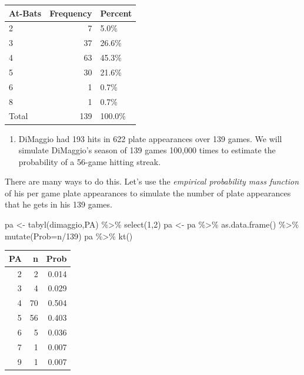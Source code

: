 \documentclass[
  11pt,
]{book}
\newenvironment{Shaded}{\begin{snugshade}}{\end{snugshade}}
\newcommand{\AttributeTok}[1]{\textcolor[rgb]{0.77,0.63,0.00}{#1}}
\newcommand{\DecValTok}[1]{\textcolor[rgb]{0.00,0.00,0.81}{#1}}
\newcommand{\FunctionTok}[1]{\textcolor[rgb]{0.00,0.00,0.00}{#1}}
\newcommand{\NormalTok}[1]{#1}
\newcommand{\OtherTok}[1]{\textcolor[rgb]{0.56,0.35,0.01}{#1}}
\newcommand{\SpecialCharTok}[1]{\textcolor[rgb]{0.00,0.00,0.00}{#1}}
\providecommand{\tightlist}{%
  \setlength{\itemsep}{0pt}\setlength{\parskip}{0pt}}
\theoremstyle{definition}
\theoremstyle{definition}
\theoremstyle{definition}
\theoremstyle{definition}
\theoremstyle{remark}
\begin{document}
\begin{table}[H]
\centering
\begin{tabular}{lrl}
\toprule
At-Bats & Frequency & Percent\\
\midrule
2 & 7 & 5.0\%\\
3 & 37 & 26.6\%\\
4 & 63 & 45.3\%\\
5 & 30 & 21.6\%\\
6 & 1 & 0.7\%\\
8 & 1 & 0.7\%\\
Total & 139 & 100.0\%\\
\bottomrule
\end{tabular}
\end{table}

\vfill
\newpage

\begin{enumerate}
\def\labelenumi{(\alph{enumi})}
\setcounter{enumi}{2}
\tightlist
\item
  DiMaggio had 193 hits in 622 plate appearances over 139 games. We will simulate DiMaggio's season of 139 games 100,000 times to estimate the probability of a 56-game hitting streak.
\end{enumerate}

There are many ways to do this. Let's use the \emph{empirical probability mass function} of his per game plate appearances to simulate the number of plate appearances that he gets in his 139 games.

\begin{Shaded}
\begin{Highlighting}[]
\NormalTok{pa }\OtherTok{\textless{}{-}} \FunctionTok{tabyl}\NormalTok{(dimaggio,PA) }\SpecialCharTok{\%\textgreater{}\%} \FunctionTok{select}\NormalTok{(}\DecValTok{1}\NormalTok{,}\DecValTok{2}\NormalTok{)}
\NormalTok{pa }\OtherTok{\textless{}{-}}\NormalTok{ pa }\SpecialCharTok{\%\textgreater{}\%} 
  \FunctionTok{as.data.frame}\NormalTok{() }\SpecialCharTok{\%\textgreater{}\%}
  \FunctionTok{mutate}\NormalTok{(}\AttributeTok{Prob=}\NormalTok{n}\SpecialCharTok{/}\DecValTok{139}\NormalTok{)}
\NormalTok{pa }\SpecialCharTok{\%\textgreater{}\%} \FunctionTok{kt}\NormalTok{()}
\end{Highlighting}
\end{Shaded}

\begin{table}[H]
\centering
\begin{tabular}{rrr}
\toprule
PA & n & Prob\\
\midrule
2 & 2 & 0.014\\
3 & 4 & 0.029\\
4 & 70 & 0.504\\
5 & 56 & 0.403\\
6 & 5 & 0.036\\
7 & 1 & 0.007\\
9 & 1 & 0.007\\
\bottomrule
\end{tabular}
\end{table}
\end{document}
